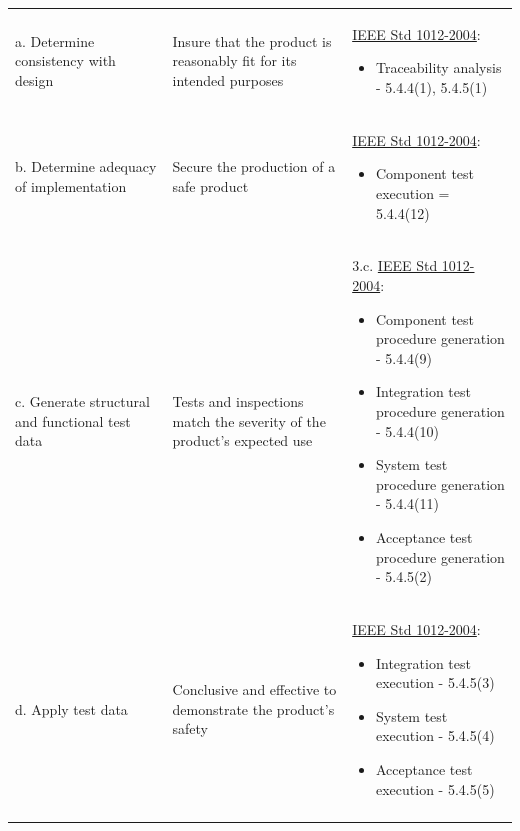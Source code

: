 \begin{longtable}{| p{2in} | p{2in} | p{2in} |}
\hline \newpage
\multicolumn{3}{|c|}{\textit{\textbf{3. Construction}}}\\
\hline
a. Determine consistency with design & Insure that the product is reasonably
fit for its intended purposes & \underline{IEEE Std 1012-2004}:
\begin{small}\begin{itemize}
\item Traceability analysis - 5.4.4(1), 5.4.5(1)
\end{itemize}\end{small}\\
\hline
b. Determine adequacy of implementation & Secure the production of a safe
product & \underline{IEEE Std 1012-2004}:
\begin{small}\begin{itemize}
\item Component test execution = 5.4.4(12)
\end{itemize}\end{small}\\
\hline
c. Generate structural and functional test data & Tests and inspections match
the severity of the product's expected use & 3.c.
\underline{IEEE Std 1012-2004}:
\begin{small}\begin{itemize}
\item Component test procedure generation - 5.4.4(9)
\item Integration test procedure generation - 5.4.4(10)
\item System test procedure generation - 5.4.4(11)
\item Acceptance test procedure generation - 5.4.5(2)
\end{itemize}\end{small}\\
\hline
d. Apply test data & Conclusive and effective to demonstrate the product's
safety & \underline{IEEE Std 1012-2004}:
\begin{small}\begin{itemize}
\item Integration test execution - 5.4.5(3)
\item System test execution - 5.4.5(4)
\item Acceptance test execution - 5.4.5(5)
\end{itemize}\end{small}\\
\hline \newpage
\multicolumn{3}{|c|}{\textit{\textbf{4. Operation and Maintenance}}}\\

\end{longtable}

